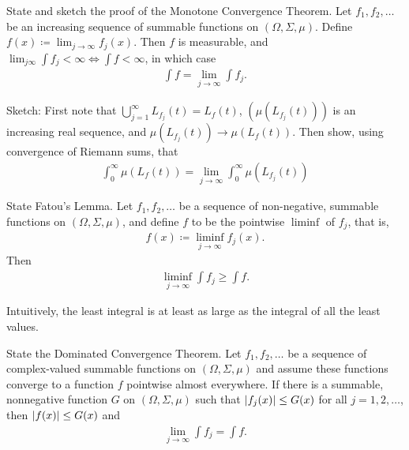 \documentclass[avery5388,grid,frame]{flashcards}
\begin{document}
\begin{flashcard}
    {State and sketch the proof of the Monotone Convergence Theorem.}
    Let $f_1,f_2,\dots$ be an increasing sequence of summable functions on $(\Omega, \Sigma, \mu)$.  Define $f(x) \coloneqq \lim_{j\rightarrow \infty} f_j(x)$.  Then $f$ is measurable, and $\lim_{j\infty}\int f_j < \infty \iff \int f < \infty$, in which case
    \begin{align*}
        \int f = \lim_{j\rightarrow \infty} \int f_j.
    \end{align*}

    Sketch: First note that $\bigcup_{j=1}^\infty L_{f_j}(t) = L_f(t)$, $(\mu(L_{f_j}(t)))$ is an increasing real sequence, and $\mu(L_{f_j}(t)) \rightarrow \mu(L_f(t))$.  Then show, using convergence of Riemann sums, that
    \begin{align*}
        \int_0^\infty \mu(L_f(t)) = \lim_{j\rightarrow\infty} \int_0^\infty \mu(L_{f_j}(t))
    \end{align*}
\end{flashcard}

\begin{flashcard}
    {State Fatou's Lemma.}
    Let $f_1,f_2,\dots$ be a sequence of non-negative, summable functions on $(\Omega,\Sigma,\mu)$, and define $f$ to be the pointwise $\liminf$ of $f_j$, that is,
    \begin{align*}
        f(x) \coloneqq \liminf_{j\rightarrow\infty}f_j(x).
    \end{align*}
    Then
    \begin{align*}
        \liminf_{j\rightarrow \infty} \int f_j \geq \int f.
    \end{align*}

    Intuitively, the least integral is at least as large as the integral of all the least values.
\end{flashcard}

\begin{flashcard}
    {State the Dominated Convergence Theorem.}
    Let $f_1,f_2,\dots$ be a sequence of complex-valued summable functions on $(\Omega,\Sigma,\mu)$ and assume these functions converge to a function $f$ pointwise almost everywhere.  If there is a summable, nonnegative function $G$ on $(\Omega,\Sigma,\mu)$ such that $\abs{f_j(x)} \leq G(x)$ for all $j = 1,2,\dots$, then $\abs{f(x)} \leq G(x)$ and
    \begin{align*}
        \lim_{j\rightarrow\infty}\int f_j = \int f.
    \end{align*}
\end{flashcard}
\end{document}
